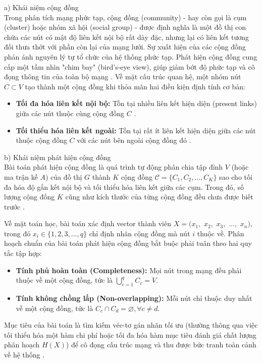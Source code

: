 \documentclass[14pt,a4paper]{extarticle}
\begin{document}
\noindent a) Khái niệm cộng đồng \\ \indent
Trong phân tích mạng phức tạp, cộng đồng (community) - hay còn gọi là cụm (cluster) hoặc nhóm xã hội (social group) - được định nghĩa là một đồ thị con chứa các nút có mật độ liên kết nội bộ rất dày đặc, nhưng lại có liên kết tương đối thưa thớt với phần còn lại của mạng lưới. Sự xuất hiện của các cộng đồng phản ánh nguyên lý tự tổ chức của hệ thống phức tạp. Phát hiện cộng đồng cung cấp một tầm nhìn "chim bay" (bird's-eye view), giúp giảm bớt độ phức tạp và cô đọng thông tin của toàn bộ mạng \cite{Traag2014}. Về mặt cấu trúc quan hệ, một nhóm nút $C \subset V$ tạo thành một cộng đồng khi thỏa mãn hai điều kiện định tính cơ bản:
\begin{itemize}
    \item \textbf{Tối đa hóa liên kết nội bộ:} Tồn tại nhiều liên kết hiện diện (present links) giữa các nút thuộc cùng cộng đồng $C$ \cite{Traag2014}.
    \item \textbf{Tối thiểu hóa liên kết ngoài:} Tồn tại rất ít liên kết hiện diện giữa các nút thuộc cộng đồng $C$ với các nút bên ngoài cộng đồng đó \cite{Traag2014}.
\end{itemize}


\noindent b) Khái niệm phát hiện cộng đồng \\ \indent
Bài toán phát hiện cộng đồng là quá trình tự động phân chia tập đỉnh $V$ (hoặc ma trận kề $A$) của đồ thị $G$ thành $K$ cộng đồng $\mathcal{C} = \{C_1, C_2, \dots, C_K\}$ sao cho tối đa hóa độ gắn kết nội bộ và tối thiểu hóa liên kết giữa các cụm. Trong đó, số lượng cộng đồng $K$ cũng như kích thước của từng cộng đồng đều chưa được biết trước \cite{Baraa2021}. 

Về mặt toán học, bài toán xác định vector thành viên $X = (x_1,$ $x_2,$ $x_3,$ $\dots,$ $x_n)$, trong đó $x_i \in \{1, 2, 3, \dots, q\}$ chỉ định nhãn cộng đồng mà nút $i$ thuộc về. Phân hoạch chuẩn của bài toán phát hiện cộng đồng bắt buộc phải tuân theo hai quy tắc tập hợp:
\begin{itemize}
    \item \textbf{Tính phủ hoàn toàn (Completeness):} Mọi nút trong mạng đều phải thuộc về một cộng đồng, tức là $\bigcup_{c=1}^{q} C_c = V$.
    \item \textbf{Tính không chồng lấp (Non-overlapping):} Mỗi nút chỉ thuộc duy nhất về một cộng đồng, tức là $C_c \cap C_d = \varnothing, \forall c \neq d$.
\end{itemize}
Mục tiêu của bài toán là tìm kiếm véc-tơ gán nhãn tối ưu (thường thông qua việc tối thiểu hóa một hàm chi phí hoặc tối đa hóa hàm mục tiêu đánh giá chất lượng phân hoạch $H(X)$) để cô đọng cấu trúc mạng và thu được bức tranh toàn cảnh về hệ thống \cite{Traag2014}.
\end{document}
